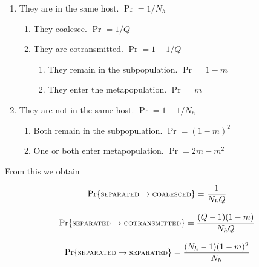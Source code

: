 \documentclass[_main.tex]{subfiles}
\begin{document}
\begin{enumerate} [noitemsep]

\item They are in the same host.  $\Pr = 1/N_h$

\begin{enumerate} [noitemsep]

\item They coalesce. $\Pr = 1/Q$

\item They are cotransmitted. $\Pr = 1 - 1/Q$

\begin{enumerate} [noitemsep]

\item They remain in the subpopulation. $\Pr = 1 - m$ 

\item They enter the metapopulation. $\Pr = m$

\end{enumerate}

\end{enumerate}

\item They are not in the same host. $\Pr = 1 - 1/N_h$

\begin{enumerate} [noitemsep]

\item Both remain in the subpopulation. $\Pr = (1 - m)^2$

\item One or both enter metapopulation. $\Pr = 2m - m^2$

\end{enumerate}

\end{enumerate}

\noindent From this we obtain

\begin{equation*}
\Pr \{ \textsc{\small{separated}} \rightarrow \textsc{\small{coalesced}} \} 
= \frac{1}{N_h Q}
\end{equation*}

\begin{equation*}
\Pr \{ \textsc{\small{separated}} \rightarrow \textsc{\small{cotransmitted}} \} 
= \frac{(Q -1)(1-m)}{N_h Q}
\end{equation*}

\begin{equation*}
\Pr \{ \textsc{\small{separated}} \rightarrow \textsc{\small{separated}} \} 
= \frac{(N_h - 1)(1-m)^2}{N_h}
\end{equation*}
\end{document}
